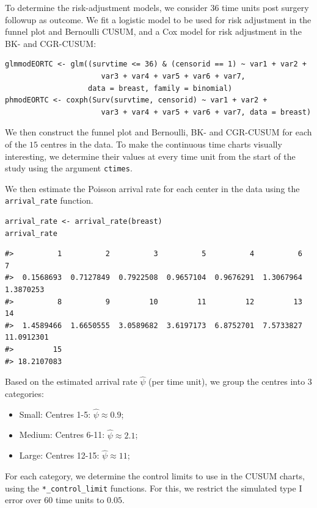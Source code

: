 To determine the risk-adjustment models, we consider \(36\) time units post surgery followup as outcome. We fit a logistic model to be used for risk adjustment in the funnel plot and Bernoulli CUSUM, and a Cox model for risk adjustment in the BK- and CGR-CUSUM:

\begin{verbatim}
glmmodEORTC <- glm((survtime <= 36) & (censorid == 1) ~ var1 + var2 +
                      var3 + var4 + var5 + var6 + var7,
                   data = breast, family = binomial)
phmodEORTC <- coxph(Surv(survtime, censorid) ~ var1 + var2 +
                      var3 + var4 + var5 + var6 + var7, data = breast)
\end{verbatim}

We then construct the funnel plot and Bernoulli, BK- and CGR-CUSUM for each of the \(15\) centres in the data. To make the continuous time charts visually interesting, we determine their values at every time unit from the start of the study using the argument \texttt{ctimes}.

We then estimate the Poisson arrival rate for each center in the data using the \texttt{arrival\_rate} function.

\begin{verbatim}
arrival_rate <- arrival_rate(breast)
arrival_rate
\end{verbatim}

\begin{verbatim}
#>          1          2          3          5          4          6          7 
#>  0.1568693  0.7127849  0.7922508  0.9657104  0.9676291  1.3067964  1.3870253 
#>          8          9         10         11         12         13         14 
#>  1.4589466  1.6650555  3.0589682  3.6197173  6.8752701  7.5733827 11.0912301 
#>         15 
#> 18.2107083
\end{verbatim}

Based on the estimated arrival rate \(\hat{\psi}\) (per time unit), we group the centres into \(3\) categories:

\begin{itemize}
\tightlist
\item
  Small: Centres 1-5: \(\hat{\psi} \approx 0.9\);
\item
  Medium: Centres 6-11: \(\hat{\psi} \approx 2.1\);
\item
  Large: Centres 12-15: \(\hat{\psi} \approx 11\);
\end{itemize}

For each category, we determine the control limits to use in the CUSUM charts, using the \texttt{*\_control\_limit} functions. For this, we restrict the simulated type I error over \(60\) time units to \(0.05\).

